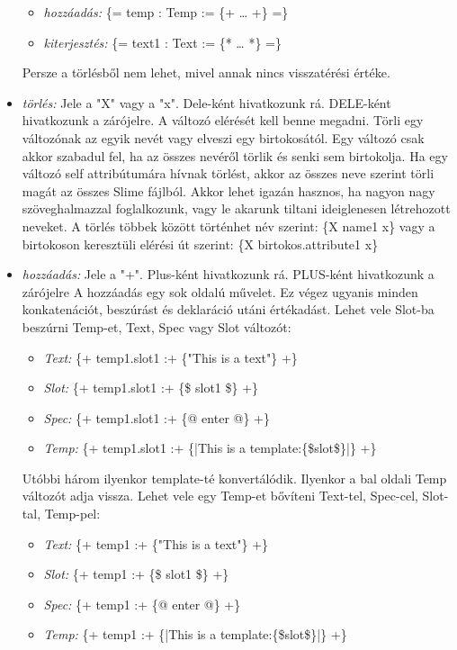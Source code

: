 \begin{itemize}
\begin{itemize}
\item\emph{hozzáadás:} \{= temp : Temp := \{+ … +\} =\}
\item\emph{kiterjesztés:} \{= text1 : Text := \{* … *\} =\}
\end{itemize}
Persze a törlésből nem lehet, mivel annak nincs visszatérési értéke.
\item \emph{törlés:} 
Jele a "X" vagy a "x".
Dele-ként hivatkozunk rá.
DELE-ként hivatkozunk a zárójelre.
A változó elérését kell benne megadni.
Törli egy változónak az egyik nevét vagy elveszi egy birtokosától.
Egy változó csak akkor szabadul fel, ha az összes nevéről törlik és senki sem birtokolja.
Ha egy változó self attribútumára hívnak törlést, akkor az összes neve szerint törli magát az összes Slime fájlból.
Akkor lehet igazán hasznos, ha nagyon nagy szöveghalmazzal foglalkozunk, vagy le akarunk tiltani ideiglenesen létrehozott neveket.
A törlés többek között történhet név szerint: \{X name1 x\} vagy a birtokoson keresztüli elérési út szerint: \{X birtokos.attribute1 x\} 
\item \emph{hozzáadás:}
Jele a "+".
Plus-ként hivatkozunk rá.
PLUS-ként hivatkozunk a zárójelre
A hozzáadás egy sok oldalú művelet. 
Ez végez ugyanis minden konkatenációt, beszúrást és deklaráció utáni értékadást.
Lehet vele Slot-ba beszúrni Temp-et, Text, Spec vagy Slot változót: 
\begin{itemize}
\item\emph{Text:} \{+ temp1.slot1 :+ \{"This is a text"\} +\}
\item\emph{Slot:} \{+ temp1.slot1 :+ \{\$ slot1 \$\} +\}
\item\emph{Spec:} \{+ temp1.slot1 :+ \{@ enter @\} +\}
\item\emph{Temp:} \{+ temp1.slot1 :+ \{|This is a template:\{\$slot\$\}|\} +\}
\end{itemize}
Utóbbi három ilyenkor template-té konvertálódik.  
Ilyenkor a bal oldali Temp változót  adja vissza.
Lehet vele egy Temp-et bővíteni Text-tel, Spec-cel, Slot-tal, Temp-pel:
\begin{itemize}
\item\emph{Text:} \{+ temp1 :+ \{"This is a text"\} +\}
\item\emph{Slot:} \{+ temp1 :+ \{\$ slot1 \$\} +\}
\item\emph{Spec:} \{+ temp1 :+ \{@ enter @\} +\}
\item\emph{Temp:} \{+ temp1 :+ \{|This is a template:\{\$slot\$\}|\} +\}

\end{itemize}
\end{itemize}
